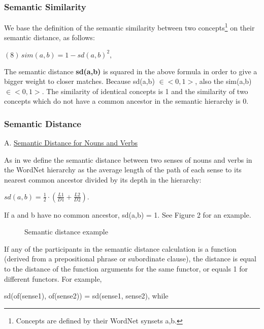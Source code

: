 \subsubsection{Semantic Similarity}
We base the definition of the semantic similarity between two concepts\footnote{
Concepts are defined by their WordNet synsets a,b.
} on their semantic distance, as follows: 
\begin{center}
$  (8)  \, sim(a,b) = 1 - sd(a,b)^{2},  $
\end{center}
The semantic distance {\bf sd(a,b)} is squared in the above formula in order to give a bigger weight to closer matches. Because sd(a,b) $\in <0,1>$, also the sim(a,b) $\in <0,1>$. The similarity of identical concepts is 1 and the similarity of two concepts which do not have a common ancestor in the semantic hierarchy is 0. 

\subsubsection{Semantic Distance}

\noindent
A. \underline{Semantic Distance for Nouns and Verbs}

As in \cite{SN97}\cite{Sussna93} we define the semantic distance between two senses of nouns and verbs in the WordNet hierarchy as the average length of the path of each sense to its nearest common ancestor divided by its depth in the hierarchy:
\begin{center}
  $ \displaystyle sd(a,b)=\frac{1}{2} \cdot (\frac{L1}{D1} + \frac{L2}{D2}). $
\end{center}
If a and b have no common ancestor, sd(a,b) = 1. See Figure 2 for an example.

\begin{figure}[t]
  \leavevmode
  \begin{center}
    \caption{Semantic distance example}
    \label{fig:2}
  \end{center}
\end{figure}


If any of the participants in the semantic distance calculation is a function (derived from a prepositional phrase or subordinate clause), the distance is equal to the distance of the function arguments for the same functor, or equals 1 for different functors. For example, 

\hspace*{2cm}
          sd(of(sense1), of(sense2)) = sd(sense1, sense2), while

